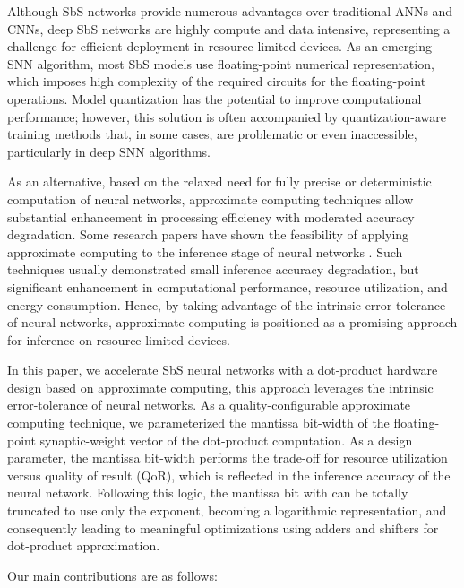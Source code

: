 Although SbS networks provide numerous advantages over traditional ANNs and CNNs, deep SbS networks are highly compute and data intensive, representing a challenge for efficient deployment in resource-limited devices. As an emerging SNN algorithm, most SbS models use floating-point numerical representation, which imposes high complexity of the required circuits for the floating-point operations. Model quantization has the potential to improve computational performance; however, this solution is often accompanied by quantization-aware training methods that, in some cases, are problematic or even inaccessible, particularly in deep SNN algorithms\cite{zhang2018survey}.

As an alternative, based on the relaxed need for fully precise or deterministic computation of neural networks, approximate computing techniques allow substantial enhancement in processing efficiency with moderated accuracy degradation. Some research papers have shown the feasibility of applying approximate computing to the inference stage of neural networks \cite{lotrivc2012applicability, sarwar2016multiplier, mrazek2016design, du2014leveraging}. Such techniques usually demonstrated small inference accuracy degradation, but significant enhancement in computational performance, resource utilization, and energy consumption. Hence, by taking advantage of the intrinsic error-tolerance of neural networks, approximate computing is positioned as a promising approach for inference on resource-limited devices.

In this paper, we accelerate SbS neural networks with a dot-product hardware design based on approximate computing, this approach leverages the intrinsic error-tolerance of neural networks. As a quality-configurable approximate computing technique, we parameterized the mantissa bit-width of the floating-point synaptic-weight vector of the dot-product computation. As a design parameter, the mantissa bit-width performs the trade-off for resource utilization versus quality of result (QoR)\cite{park2009dynamic, han2013approximate}, which is reflected in the inference accuracy of the neural network. Following this logic, the mantissa bit with can be totally truncated to use only the exponent, becoming a logarithmic representation, and consequently leading to meaningful optimizations using adders and shifters for dot-product approximation.

Our main contributions are as follows:

